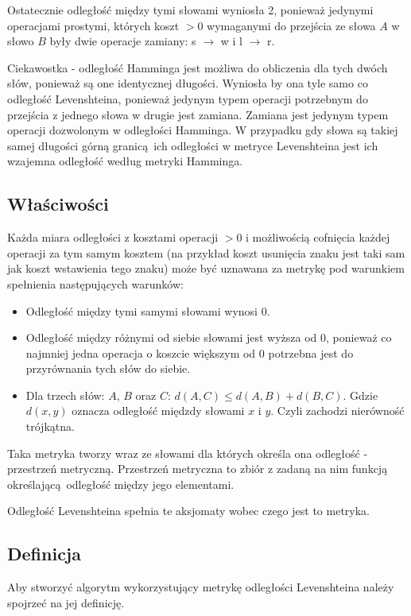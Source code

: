 \documentclass[a4paper,12pt]{article}
\begin{document}
Ostatecznie odległość między tymi słowami wyniosła 2, ponieważ jedynymi operacjami
prostymi, których koszt \( > 0 \) wymaganymi do przejścia ze słowa \( A \) w słowo \( B \)
były dwie operacje zamiany: s \( \rightarrow \) w i l \( \rightarrow \) r.

Ciekawostka - odległość Hamminga jest możliwa do obliczenia dla tych dwóch
słów, ponieważ są one identycznej długości. Wyniosła by ona tyle samo
co odległość Levenshteina, ponieważ jedynym typem operacji
potrzebnym do przejścia z jednego słowa w drugie jest zamiana.
Zamiana jest jedynym typem operacji dozwolonym w odległości Hamminga.
W przypadku gdy słowa są takiej samej długości górną granicą ich
odległości w metryce Levenshteina jest ich wzajemna odległość
według metryki Hamminga.

\subsection{Właściwości}
Każda miara odległości z kosztami operacji \( > 0 \)
i możliwością cofnięcia każdej operacji za tym samym kosztem
(na przykład koszt usunięcia znaku jest taki sam jak
koszt wstawienia tego znaku) może być uznawana za metrykę
pod warunkiem spełnienia następujących warunków:
\begin{itemize}
    \item Odległość między tymi samymi słowami wynosi 0.
    \item Odległość między różnymi od siebie słowami jest
          wyższa od 0, ponieważ co najmniej jedna operacja o koszcie
          większym od 0 potrzebna jest do przyrównania tych słów
          do siebie.
    \item Dla trzech słów: \( A \), \( B \) oraz \( C \): \( d(A,C) \le d(A,B) + d(B,C) \).
          Gdzie \( d(x,y) \) oznacza odległość międzdy słowami \( x \) i \( y \).
          Czyli zachodzi nierówność trójkątna.
\end{itemize}

Taka metryka tworzy wraz ze słowami dla których określa ona
odległość - przestrzeń metryczną. Przestrzeń metryczna to
zbiór z zadaną na nim funkcją określającą odległość między jego
elementami. \cite{wiki::metricpl}

Odległość Levenshteina spełnia te aksjomaty wobec czego jest to
metryka.

\subsection{Definicja}
Aby stworzyć algorytm wykorzystujący metrykę odległości Levenshteina
należy spojrzeć na jej definicję. \cite{wiki::levenshteinen}
\end{document}
